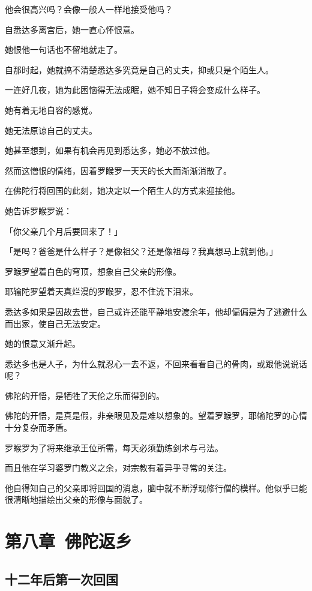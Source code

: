 \documentclass[twoside,openany]{book}
\begin{document}
他会很高兴吗？会像一般人一样地接受他吗？

自悉达多离宫后，她一直心怀恨意。

她恨他一句话也不留地就走了。

自那时起，她就搞不清楚悉达多究竟是自己的丈夫，抑或只是个陌生人。

一连好几夜，她为此困恼得无法成眠，她不知日子将会变成什么样子。

她有着无地自容的感觉。

她无法原谅自己的丈夫。

她甚至想到，如果有机会再见到悉达多，她必不放过他。

然而这憎恨的情绪，因着罗睺罗一天天的长大而渐渐消散了。

在佛陀行将回国的此刻，她决定以一个陌生人的方式来迎接他。

她告诉罗睺罗说：

「你父亲几个月后要回来了！」

「是吗？爸爸是什么样子？是像祖父？还是像祖母？我真想马上就到他。」

罗睺罗望着白色的穹顶，想象自己父亲的形像。

耶输陀罗望着天真烂漫的罗睺罗，忍不住流下泪来。

悉达多如果是因故去世，自己或许还能平静地安渡余年，他却偏偏是为了逃避什么而出家，使自己无法安定。

她的恨意又渐升起。

悉达多也是人子，为什么就忍心一去不返，不回来看看自己的骨肉，或跟他说说话呢？

佛陀的开悟，是牺牲了天伦之乐而得到的。

佛陀的开悟，是真是假，非亲眼见及是难以想象的。望着罗睺罗，耶输陀罗的心情十分复杂而矛盾。

罗睺罗为了将来继承王位所需，每天必须勤练剑术与弓法。

而且他在学习婆罗门教义之余，对宗教有着异乎寻常的关注。

他自得知自己的父亲即将回国的消息，脑中就不断浮现修行僧的模样。他似乎已能很清晰地描绘出父亲的形像与面貌了。



\chapter{第八章\ 佛陀返乡}\label{ch8}

\section{十二年后第一次回国}\label{sec8.1}
\end{document}
